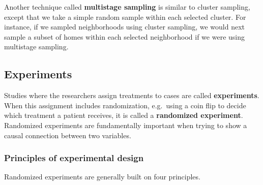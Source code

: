 \documentclass[
]{book}
\begin{document}
Another technique called \textbf{multistage sampling} is similar to cluster sampling, except that we take a simple random sample within each selected cluster. For instance, if we sampled neighborhoods using cluster sampling, we would next sample a subset of homes within each selected neighborhood if we were using multistage sampling.

\hypertarget{experiments}{%
\subsection{Experiments}\label{experiments}}

Studies where the researchers assign treatments to cases are called \textbf{experiments}. When this assignment includes randomization, e.g.~using a coin flip to decide which treatment a patient receives, it is called a \textbf{randomized experiment}. Randomized experiments are fundamentally important when trying to show a causal connection between two variables.

\hypertarget{principles-of-experimental-design}{%
\subsubsection{Principles of experimental design}\label{principles-of-experimental-design}}

Randomized experiments are generally built on four principles.
\end{document}
